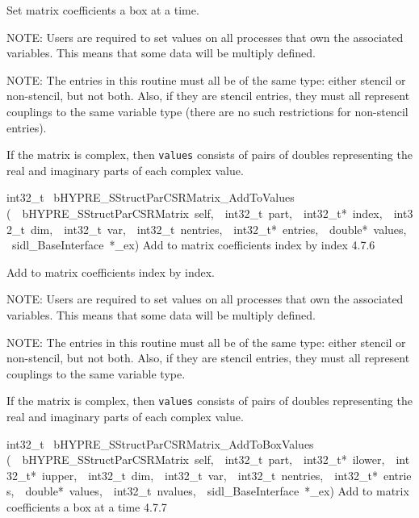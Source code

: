 \documentclass{article}
\begin{document}
\begin{cxxentry}
\begin{cxxentry}
\begin{cxxfunction}
\begin{cxxdoc}
Set matrix coefficients a box at a time.

NOTE: Users are required to set values on all processes that
own the associated variables.  This means that some data will
be multiply defined.

NOTE: The entries in this routine must all be of the same
type: either stencil or non-stencil, but not both.  Also, if
they are stencil entries, they must all represent couplings
to the same variable type (there are no such restrictions for
non-stencil entries).

If the matrix is complex, then {\tt values} consists of pairs
of doubles representing the real and imaginary parts of each
complex value.
\end{cxxdoc}
\end{cxxfunction}
\begin{cxxfunction}
{int32\_t\ }
        {bHYPRE\_SStructParCSRMatrix\_AddToValues}
        {(\ \ bHYPRE\_SStructParCSRMatrix\ self,\ \ int32\_t\ part,\ \ int32\_t*\ index,\ \ int32\_t\ dim,\ \ int32\_t\ var,\ \ int32\_t\ nentries,\ \ int32\_t*\ entries,\ \ double*\ values,\ \ sidl\_BaseInterface\ *\_ex)}
        {
Add to matrix coefficients index by index}
        {4.7.6}
\begin{cxxdoc}

Add to matrix coefficients index by index.

NOTE: Users are required to set values on all processes that
own the associated variables.  This means that some data will
be multiply defined.

NOTE: The entries in this routine must all be of the same
type: either stencil or non-stencil, but not both.  Also, if
they are stencil entries, they must all represent couplings
to the same variable type.

If the matrix is complex, then {\tt values} consists of pairs
of doubles representing the real and imaginary parts of each
complex value.
\end{cxxdoc}
\end{cxxfunction}
\begin{cxxfunction}
{int32\_t\ }
        {bHYPRE\_SStructParCSRMatrix\_AddToBoxValues}
        {(\ \ bHYPRE\_SStructParCSRMatrix\ self,\ \ int32\_t\ part,\ \ int32\_t*\ ilower,\ \ int32\_t*\ iupper,\ \ int32\_t\ dim,\ \ int32\_t\ var,\ \ int32\_t\ nentries,\ \ int32\_t*\ entries,\ \ double*\ values,\ \ int32\_t\ nvalues,\ \ sidl\_BaseInterface\ *\_ex)}
        {
Add to matrix coefficients a box at a time}
        {4.7.7}
\begin{cxxdoc}


\end{cxxdoc}
\end{cxxfunction}
\end{cxxentry}
\end{cxxentry}
\end{document}
